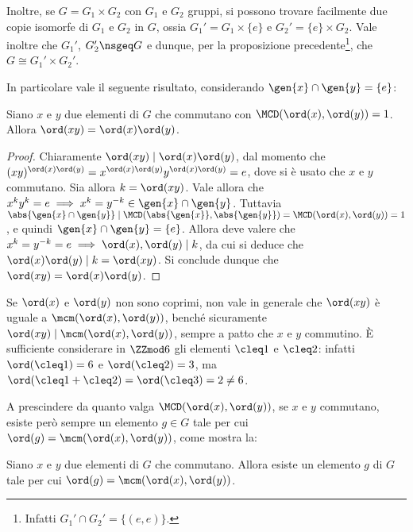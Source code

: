 \documentclass[12pt]{scrartcl}
\begin{document}
	
	Inoltre, se $G = G_1 \times G_2$ con $G_1$ e $G_2$ gruppi, si possono trovare
	facilmente due copie isomorfe di $G_1$ e $G_2$ in $G$, ossia $G_1' = G_1 \times \{e\}$ e $G_2' = \{e\} \times G_2$.
	Vale inoltre che $G_1'$, $G_2' \nsgeq G$ e dunque,
	per la proposizione precedente\footnote{Infatti $G_1' \cap G_2' = \{(e,e)\}$.}, che
	$G \cong G_1' \times G_2'$. \medskip
	
	
	In particolare vale il seguente risultato, considerando
	$\gen{x} \cap \gen{y} = \{e\}$:
	
	\begin{proposition}
		Siano $x$ e $y$ due elementi di $G$ che commutano con
		$\MCD(\ord(x), \ord(y)) = 1$. Allora $\ord(xy) = \ord(x) \ord(y)$.
	\end{proposition}
	
	\begin{proof}
		Chiaramente $\ord(xy) \mid \ord(x) \ord(y)$, dal momento
		che $(xy)^{\ord(x) \ord(y)} = x^{\ord(x) \ord(y)} y^{\ord(x) \ord(y)} = e$, dove si è usato che $x$ e $y$ commutano.
		Sia allora $k = \ord(xy)$. Vale allora che
		$x^k y^k = e \implies x^k = y^{-k} \in \gen{x} \cap \gen{y}$.
		Tuttavia $\abs{\gen{x} \cap \gen{y}} \mid
		\MCD(\abs{\gen{x}}, \abs{\gen{y}}) = \MCD(\ord(x), \ord(y)) =
		1$, e quindi $\gen{x} \cap \gen{y} = \{e\}$. Allora
		deve valere che $x^k = y^{-k} = e \implies
		\ord(x), \ord(y) \mid k$, da cui si deduce che
		$\ord(x) \ord(y) \mid k = \ord(xy)$. Si conclude dunque che
		$\ord(xy) = \ord(x) \ord(y)$.
	\end{proof}
	
	Se $\ord(x)$ e $\ord(y)$ non sono coprimi, non vale in generale
	che $\ord(xy)$ è uguale a $\mcm(\ord(x), \ord(y))$,
	benché sicuramente $\ord(xy) \mid \mcm(\ord(x), \ord(y))$,
	sempre a patto che $x$ e $y$ commutino.
	È sufficiente considerare in $\ZZmod6$ gli elementi
	$\cleq 1$ e $\cleq 2$: infatti $\ord(\cleq 1) = 6$ e
	$\ord(\cleq 2) = 3$, ma $\ord(\cleq 1 + \cleq 2) =
	\ord(\cleq 3) = 2 \neq 6$. \medskip
	
	
	A prescindere da quanto valga $\MCD(\ord(x), \ord(y))$,
	se $x$ e $y$ commutano, esiste però sempre un elemento
	$g \in G$ tale per cui $\ord(g) = \mcm(\ord(x), \ord(y))$, come
	mostra la:
	
	\begin{proposition}
		Siano $x$ e $y$ due elementi di $G$ che commutano. Allora
		esiste un elemento $g$ di $G$ tale per cui $\ord(g) = \mcm(\ord(x), \ord(y))$. 
	\end{proposition}
	
\end{document}
